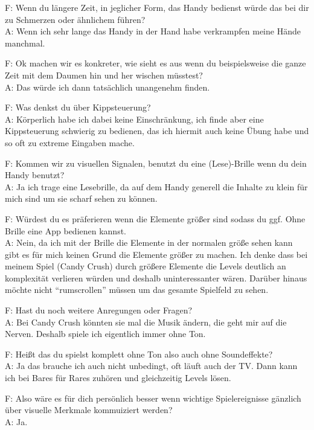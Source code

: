 \documentclass[12pt, a4paper]{article}
\begin{document}
\begin{flushleft}
F:  Wenn du längere Zeit, in jeglicher Form, das Handy bedienst würde das bei dir zu Schmerzen oder ähnlichem führen?\\
A: Wenn ich sehr lange das Handy in der Hand habe verkrampfen meine Hände manchmal.\newline

F: Ok machen wir es konkreter, wie sieht es aus wenn du beispielsweise die ganze Zeit mit dem Daumen hin und her wischen müsstest?\\
A: Das würde ich dann tatsächlich unangenehm finden.\newline

F: Was denkst du über Kippsteuerung?\\
A: Körperlich habe ich dabei keine Einschränkung, ich finde aber eine Kippsteuerung schwierig zu bedienen, das ich hiermit auch keine Übung habe und so oft zu extreme Eingaben mache.\newline

F: Kommen wir zu visuellen Signalen, benutzt du eine (Lese)-Brille wenn du dein Handy benutzt?\\
A: Ja ich trage eine Lesebrille, da auf dem Handy generell die Inhalte zu klein für mich sind um sie scharf sehen zu können.\newline

F: Würdest du es präferieren wenn die Elemente größer sind sodass du ggf. Ohne Brille eine App bedienen kannst.\\
A: Nein, da ich mit der Brille die Elemente in der normalen größe sehen kann gibt es für mich keinen Grund die Elemente größer zu machen. Ich denke dass bei meinem Spiel (Candy Crush) durch größere Elemente die Levels deutlich an komplexität verlieren würden und deshalb uninteressanter wären. Darüber hinaus möchte nicht “rumscrollen” müssen um das gesamte Spielfeld zu sehen.\newline

F: Hast du noch weitere Anregungen oder Fragen?\\
A: Bei Candy Crush könnten sie mal die Musik ändern, die geht mir auf die Nerven. Deshalb spiele ich eigentlich immer ohne Ton.\newline

F: Heißt das du spielst komplett ohne Ton also auch ohne Soundeffekte?\\
A: Ja das brauche ich auch nicht unbedingt, oft läuft auch der TV. Dann kann ich bei Bares für Rares zuhören und gleichzeitig Levels lösen.\newline

F: Also wäre es für dich persönlich besser wenn wichtige Spielereignisse gänzlich über visuelle Merkmale kommuiziert werden?\\
A: Ja.\newline

\end{flushleft}
\newpage
\end{document}
